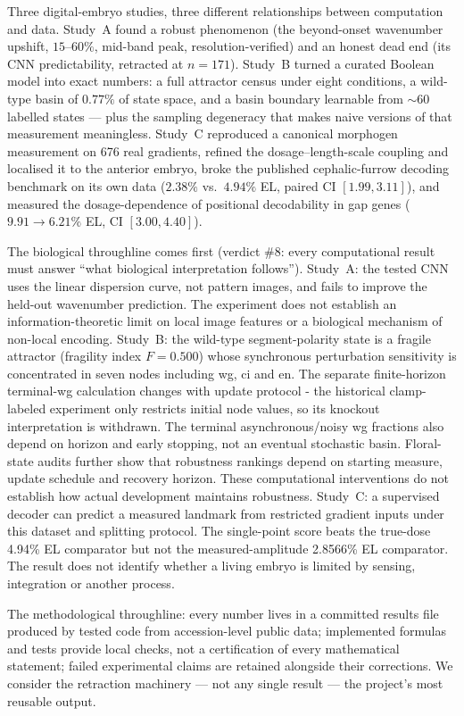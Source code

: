 Three digital-embryo studies, three different relationships between
computation and data. Study~A found a robust phenomenon (the beyond-onset
wavenumber upshift, $15$--$60\%$, mid-band peak, resolution-verified) and an
honest dead end (its CNN predictability, retracted at $n = 171$). Study~B
turned a curated Boolean model into exact numbers: a full attractor census
under eight conditions, a wild-type basin of $0.77\%$ of state space, and a
basin boundary learnable from $\sim 60$ labelled states --- plus the sampling
degeneracy that makes naive versions of that measurement meaningless.
Study~C reproduced a canonical morphogen measurement on 676 real gradients,
refined the dosage--length-scale coupling and localised it to the anterior
embryo, broke the published cephalic-furrow decoding benchmark on its own
data ($2.38\%$ vs.\ $4.94\%$ EL, paired CI $[1.99, 3.11]$), and measured the
dosage-dependence of positional decodability in gap genes ($9.91 \to 6.21\%$
EL, CI $[3.00, 4.40]$).

The biological throughline comes first (verdict \#8: every computational result must answer ``what biological interpretation follows''). Study~A: the tested CNN uses the linear dispersion curve, not pattern images, and fails to improve the held-out wavenumber prediction. The experiment does not establish an information-theoretic limit on local image features or a biological mechanism of non-local encoding. Study~B: the wild-type segment-polarity state is a fragile attractor (fragility index $F=0.500$) whose synchronous perturbation sensitivity is concentrated in seven nodes including wg, ci and en. The separate finite-horizon terminal-wg calculation changes with update protocol - the historical clamp-labeled experiment only restricts initial node values, so its knockout interpretation is withdrawn. The terminal asynchronous/noisy wg fractions also depend on horizon and early stopping, not an eventual stochastic basin. Floral-state audits further show that robustness rankings depend on starting measure, update schedule and recovery horizon. These computational interventions do not establish how actual development maintains robustness. Study~C: a supervised decoder can predict a measured landmark from restricted gradient inputs under this dataset and splitting protocol. The single-point score beats the true-dose 4.94\% EL comparator but not the measured-amplitude 2.8566\% EL comparator. The result does not identify whether a living embryo is limited by sensing, integration or another process.

The methodological throughline: every number lives in a committed results
file produced by tested code from accession-level public data; implemented formulas and tests provide local checks, not a certification of every mathematical statement; failed experimental claims are retained alongside their corrections. We consider the
retraction machinery --- not any single result --- the project's most
reusable output.


